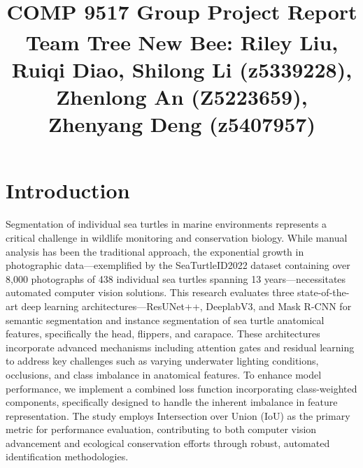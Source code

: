 \documentclass[conference]{IEEEtran}
\begin{document}
\title{COMP 9517 Group Project Report\\
{\footnotesize \textsuperscript{}Team Tree New Bee: Riley Liu, Ruiqi Diao, Shilong Li (z5339228), Zhenlong An (Z5223659), Zhenyang Deng (z5407957)}
}

\maketitle



\section{Introduction}
Segmentation of individual sea turtles in marine environments represents a critical challenge in wildlife monitoring and conservation biology. While manual analysis has been the traditional approach, the exponential growth in photographic data—exemplified by the SeaTurtleID2022 dataset containing over 8,000 photographs of 438 individual sea turtles spanning 13 years—necessitates automated computer vision solutions. This research evaluates three state-of-the-art deep learning architectures—ResUNet++, DeeplabV3, and Mask R-CNN for semantic segmentation and instance segmentation of sea turtle anatomical features, specifically the head, flippers, and carapace. These architectures incorporate advanced mechanisms including attention gates and residual learning to address key challenges such as varying underwater lighting conditions, occlusions, and class imbalance in anatomical features. To enhance model performance, we implement a combined loss function incorporating class-weighted components, specifically designed to handle the inherent imbalance in feature representation. The study employs Intersection over Union (IoU) as the primary metric for performance evaluation, contributing to both computer vision advancement and ecological conservation efforts through robust, automated identification methodologies.
\end{document}
